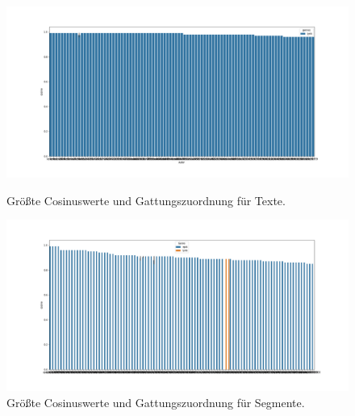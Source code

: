 \documentclass[a4paper,10p]{article}
\begin{document}
\begin{figure}{}
	\centering
	\begin{minipage}[b]{.45\linewidth}
		\centering
		\includegraphics[width=\linewidth]{autoren_100cos_gattung.png}
		\caption{Größte Cosinuswerte und Gattungszuordnung für Texte.}
	\end{minipage}
	\hfill
	\begin{minipage}[b]{.45\linewidth}
		\centering
		\includegraphics[width=\linewidth]{autoren_segmente_100cos_gattung.png}
		\caption{Größte Cosinuswerte und Gattungszuordnung für Segmente.} 

	\end{minipage}
		\label{autoren_100cos}
\end{figure}
\end{document}
